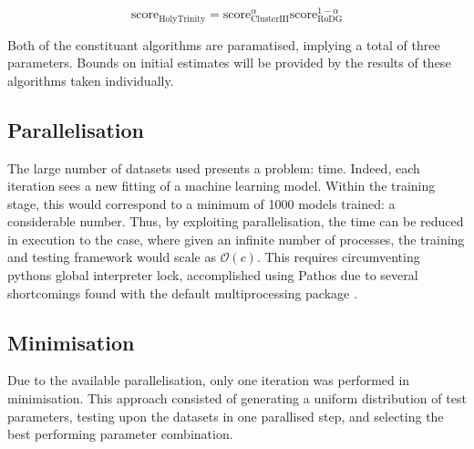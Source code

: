 \begin{equation}
  \label{eq:holyTrinity}
  {\mathrm{score}_\mathrm{Holy Trinity}=\mathrm{score}_\mathrm{Cluster III}^{\alpha}\mathrm{score}_\mathrm{RoDG}^{1-\alpha}}
\end{equation}

Both of the constituant algorithms are paramatised, implying a total of three parameters. Bounds on initial estimates will be provided by the results of these algorithms taken individually.

\subsection{Parallelisation}
The large number of datasets used presents a problem: time. Indeed, each iteration sees a new fitting of a machine learning model. Within the training stage, this would correspond to a minimum of 1000 models trained: a considerable number. Thus, by exploiting parallelisation, the time can be reduced in execution to the case, where given an infinite number of processes, the training and testing framework would scale as $\mathcal{O}(c)$. This requires circumventing pythons global interpreter lock, accomplished using Pathos due to several shortcomings found with the default multiprocessing package \cite{pathos1,pathos2}.

\subsection{Minimisation}
Due to the available parallelisation, only one iteration was performed in minimisation. This approach consisted of generating a uniform distribution of test parameters, testing upon the datasets in one parallised step, and selecting the best performing parameter combination.
